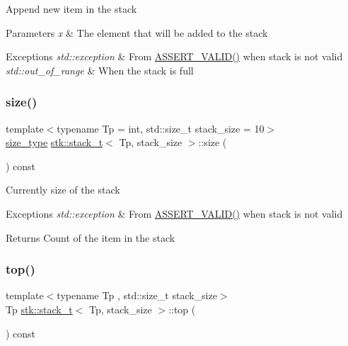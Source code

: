 Append new item in the stack 
\begin{DoxyParams}{Parameters}
{\em x} & The element that will be added to the stack \\
\hline
\end{DoxyParams}

\begin{DoxyExceptions}{Exceptions}
{\em std\+::exception} & From \hyperlink{stack_8h_a4ad7af85cae2910ffcf6bfbcb8278886}{A\+S\+S\+E\+R\+T\+\_\+\+V\+A\+L\+I\+D()} when stack is not valid \\
\hline
{\em std\+::out\+\_\+of\+\_\+range} & When the stack is full \\
\hline
\end{DoxyExceptions}
\mbox{\label{classstk_1_1stack__t_a50dbd2e6626510af69ba1f38882ca1b5}} 
\subsubsection{\texorpdfstring{size()}{size()}}
{\footnotesize\ttfamily template$<$typename Tp  = int, std\+::size\+\_\+t stack\+\_\+size = 10$>$ \\
\hyperlink{classstk_1_1stack__t_ade199c494a8e4455f76cc04faf138ed8}{size\+\_\+type} \hyperlink{classstk_1_1stack__t}{stk\+::stack\+\_\+t}$<$ Tp, stack\+\_\+size $>$\+::size (\begin{DoxyParamCaption}{ }\end{DoxyParamCaption}) const\hspace{0.3cm}{\ttfamily [inline]}}

Currently size of the stack 
\begin{DoxyExceptions}{Exceptions}
{\em std\+::exception} & From \hyperlink{stack_8h_a4ad7af85cae2910ffcf6bfbcb8278886}{A\+S\+S\+E\+R\+T\+\_\+\+V\+A\+L\+I\+D()} when stack is not valid \\
\hline
\end{DoxyExceptions}
\begin{DoxyReturn}{Returns}
Count of the item in the stack 
\end{DoxyReturn}
\mbox{\label{classstk_1_1stack__t_a4c8dca98c8f18b9d60398ac75aba5af7}} 
\subsubsection{\texorpdfstring{top()}{top()}}
{\footnotesize\ttfamily template$<$typename Tp , std\+::size\+\_\+t stack\+\_\+size$>$ \\
Tp \hyperlink{classstk_1_1stack__t}{stk\+::stack\+\_\+t}$<$ Tp, stack\+\_\+size $>$\+::top (\begin{DoxyParamCaption}{ }\end{DoxyParamCaption}) const}

